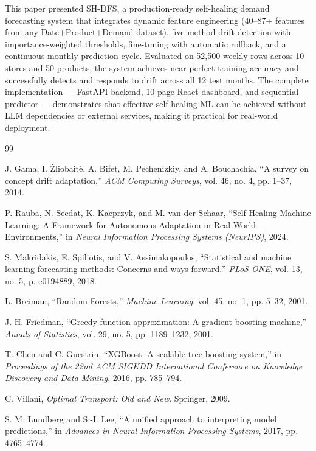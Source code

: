 \documentclass[conference]{IEEEtran}
\begin{document}
This paper presented SH-DFS, a production-ready self-healing demand forecasting system that integrates dynamic feature engineering (40--87+ features from any Date+Product+Demand dataset), five-method drift detection with importance-weighted thresholds, fine-tuning with automatic rollback, and a continuous monthly prediction cycle. Evaluated on 52,500 weekly rows across 10 stores and 50 products, the system achieves near-perfect training accuracy and successfully detects and responds to drift across all 12 test months. The complete implementation — FastAPI backend, 10-page React dashboard, and sequential predictor — demonstrates that effective self-healing ML can be achieved without LLM dependencies or external services, making it practical for real-world deployment.

\begin{thebibliography}{99}

 J. Gama, I. \v{Z}liobait\.{e}, A. Bifet, M. Pechenizkiy, and A. Bouchachia, ``A survey on concept drift adaptation,'' \textit{ACM Computing Surveys}, vol. 46, no. 4, pp. 1--37, 2014.

 P. Rauba, N. Seedat, K. Kacprzyk, and M. van der Schaar, ``Self-Healing Machine Learning: A Framework for Autonomous Adaptation in Real-World Environments,'' in \textit{Neural Information Processing Systems (NeurIPS)}, 2024.

 S. Makridakis, E. Spiliotis, and V. Assimakopoulos, ``Statistical and machine learning forecasting methods: Concerns and ways forward,'' \textit{PLoS ONE}, vol. 13, no. 5, p. e0194889, 2018.

 L. Breiman, ``Random Forests,'' \textit{Machine Learning}, vol. 45, no. 1, pp. 5--32, 2001.

 J. H. Friedman, ``Greedy function approximation: A gradient boosting machine,'' \textit{Annals of Statistics}, vol. 29, no. 5, pp. 1189--1232, 2001.

 T. Chen and C. Guestrin, ``XGBoost: A scalable tree boosting system,'' in \textit{Proceedings of the 22nd ACM SIGKDD International Conference on Knowledge Discovery and Data Mining}, 2016, pp. 785--794.

 C. Villani, \textit{Optimal Transport: Old and New}. Springer, 2009.

 S. M. Lundberg and S.-I. Lee, ``A unified approach to interpreting model predictions,'' in \textit{Advances in Neural Information Processing Systems}, 2017, pp. 4765--4774.

\end{thebibliography}
\end{document}
